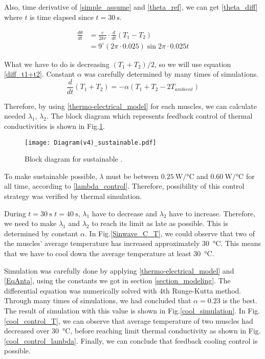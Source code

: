 Also, time derivative of \eqref{simple_assume} and \eqref{theta_ref}, we can get \eqref{theta_diff} where $t$ is time elapsed since $t=\SI{30}{\second}$.

\begin{equation} \label{theta_diff}
\begin{aligned} 
\frac{d\theta}{dt} & = \frac{c}{2kr}\cdot\frac{d}{dt}(T_{1}-T_{2}) \\
& = 9^{\circ}(2\pi\cdot 0.025)\sin{2\pi\cdot 0.025t} 
\end{aligned}
\end{equation}


What we have to do is decreasing $(T_{1}+T_{2})/2$, so we will use equation \eqref{diff_t1+t2}. Constant $\alpha$ was carefully determined by many times of simulations.
\begin{equation} \label{diff_t1+t2}
\frac{d}{dt}(T_{1}+T_{2}) = -\alpha(T_{1}+T_{2}-2T_{ambient})
\end{equation}

Therefore, by using \eqref{thermo-electrical_model} for each muscles, we can calculate needed $\lambda_{1}$, $\lambda_{2}$. The block diagram which represents feedback control of thermal conductivities is shown in Fig.\ref{diagram_sustainable}.

\begin{figure}[t]
	\centering\texttt{[image: Diagram(v4)\_sustainable.pdf]}
	\caption{Block diagram for sustainable \apcnospace.}
	\label{diagram_sustainable}
\end{figure}

To make sustainable \apc possible, $\lambda$ must be between $\SI{0.25}{\watt\per\degreeCelsius}$ and $\SI{0.60}{\watt\per\degreeCelsius}$ for all time, according to \eqref{lambda_control}. Therefore, possibility of this control strategy was verified by thermal simulation.

During $t=\SI{30}{\second}$ $t=\SI{40}{\second}$, $\lambda_{1}$ have to decrease and $\lambda_{2}$ have to increase. Therefore, we need to make $\lambda_{1}$ and $\lambda_{2}$ to reach its limit as late as possible. This is determined by constant $\alpha$. 
In Fig.\ref{Sinwave_C_T}, we could observe that two of the muscles' average temperature has increased approximately  \SI{30}{\degreeCelsius}. This means that we have to cool down the average temperature at least \SI{30}{\degreeCelsius}. 

Simulation was carefully done by applying \eqref{thermo-electrical_model} and \eqref{EqAnta}, using the constants we got in section \ref{section_modeling}. The differential equation was numerically solved with 4th Runge-Kutta method.
Through many times of simulations, we had concluded that $\alpha = 0.23$ is the best. The result of simulation with this value is shown in Fig.\ref{cool_simulation}. In Fig.\ref{cool_control_T}, we can observe that average temperature of two muscles had decreased over \SI{30}{\degreeCelsius}, before reaching limit thermal conductivity as shown in Fig.\ref{cool_control_lambda}. Finally, we can conclude that feedback cooling control is possible.

